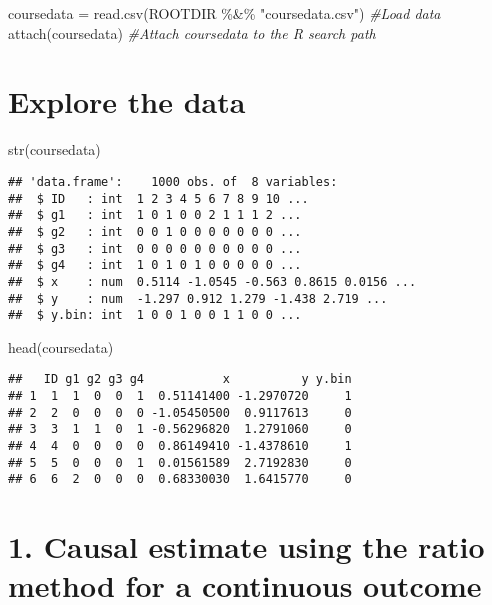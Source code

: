\documentclass[
]{article}
\newenvironment{Shaded}{\begin{snugshade}}{\end{snugshade}}
\newcommand{\CommentTok}[1]{\textcolor[rgb]{0.56,0.35,0.01}{\textit{#1}}}
\newcommand{\FunctionTok}[1]{\textcolor[rgb]{0.00,0.00,0.00}{#1}}
\newcommand{\NormalTok}[1]{#1}
\newcommand{\OtherTok}[1]{\textcolor[rgb]{0.56,0.35,0.01}{#1}}
\newcommand{\SpecialCharTok}[1]{\textcolor[rgb]{0.00,0.00,0.00}{#1}}
\newcommand{\StringTok}[1]{\textcolor[rgb]{0.31,0.60,0.02}{#1}}
\begin{document}
\begin{Shaded}
\begin{Highlighting}[]
\NormalTok{coursedata }\OtherTok{=} \FunctionTok{read.csv}\NormalTok{(ROOTDIR }\SpecialCharTok{\%\&\%} \StringTok{"coursedata.csv"}\NormalTok{) }\CommentTok{\#Load data}
\FunctionTok{attach}\NormalTok{(coursedata) }\CommentTok{\#Attach coursedata to the R search path }
\end{Highlighting}
\end{Shaded}

\hypertarget{explore-the-data}{%
\section{Explore the data}\label{explore-the-data}}

\begin{Shaded}
\begin{Highlighting}[]
\FunctionTok{str}\NormalTok{(coursedata)}
\end{Highlighting}
\end{Shaded}

\begin{verbatim}
## 'data.frame':    1000 obs. of  8 variables:
##  $ ID   : int  1 2 3 4 5 6 7 8 9 10 ...
##  $ g1   : int  1 0 1 0 0 2 1 1 1 2 ...
##  $ g2   : int  0 0 1 0 0 0 0 0 0 0 ...
##  $ g3   : int  0 0 0 0 0 0 0 0 0 0 ...
##  $ g4   : int  1 0 1 0 1 0 0 0 0 0 ...
##  $ x    : num  0.5114 -1.0545 -0.563 0.8615 0.0156 ...
##  $ y    : num  -1.297 0.912 1.279 -1.438 2.719 ...
##  $ y.bin: int  1 0 0 1 0 0 1 1 0 0 ...
\end{verbatim}

\begin{Shaded}
\begin{Highlighting}[]
\FunctionTok{head}\NormalTok{(coursedata)}
\end{Highlighting}
\end{Shaded}

\begin{verbatim}
##   ID g1 g2 g3 g4           x          y y.bin
## 1  1  1  0  0  1  0.51141400 -1.2970720     1
## 2  2  0  0  0  0 -1.05450500  0.9117613     0
## 3  3  1  1  0  1 -0.56296820  1.2791060     0
## 4  4  0  0  0  0  0.86149410 -1.4378610     1
## 5  5  0  0  0  1  0.01561589  2.7192830     0
## 6  6  2  0  0  0  0.68330030  1.6415770     0
\end{verbatim}

\hypertarget{causal-estimate-using-the-ratio-method-for-a-continuous-outcome}{%
\section{1. Causal estimate using the ratio method for a continuous
outcome}\label{causal-estimate-using-the-ratio-method-for-a-continuous-outcome}}
\end{document}
